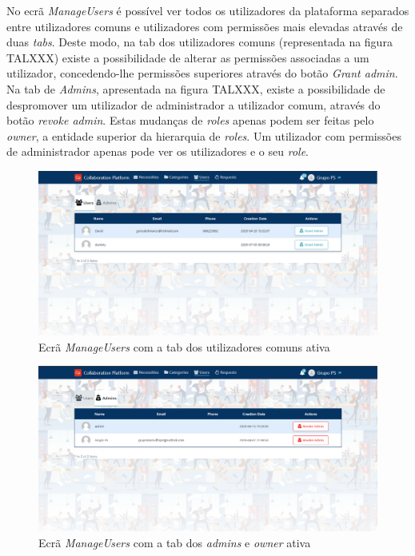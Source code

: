 No ecrã \textit{ManageUsers} é possível ver todos os utilizadores da plataforma separados entre utilizadores comuns e utilizadores com permissões mais elevadas através de duas \textit{tabs}.
Deste modo, na tab dos utilizadores comuns (representada na figura TALXXX) existe a possibilidade de alterar as permissões associadas a um utilizador, concedendo-lhe permissões superiores através do botão \textit{Grant admin}.
Na tab de \textit{Admins}, apresentada na figura TALXXX, existe a possibilidade de despromover um utilizador de administrador a utilizador comum, através do botão \textit{revoke admin}. 
Estas mudanças de \textit{roles} apenas podem ser feitas pelo \textit{owner}, a entidade superior da hierarquia de \textit{roles}. Um utilizador com permissões de administrador apenas pode ver os utilizadores e o seu \textit{role}. 

\begin{figure}[H]
  \centering 
  \includegraphics[scale=0.35]{figures/backoffice_users_users.png}
  \caption{Ecrã \textit{ManageUsers} com a tab dos utilizadores comuns ativa }\label{fig:backoffice_users_users}
\end{figure}



\begin{figure}[H]
  \centering 
  \includegraphics[scale=0.35]{figures/backoffice_users_admin.png}
  \caption{Ecrã \textit{ManageUsers} com a tab dos \textit{admins} e \textit{owner} ativa }\label{fig:backoffice_users_admin}
\end{figure}


